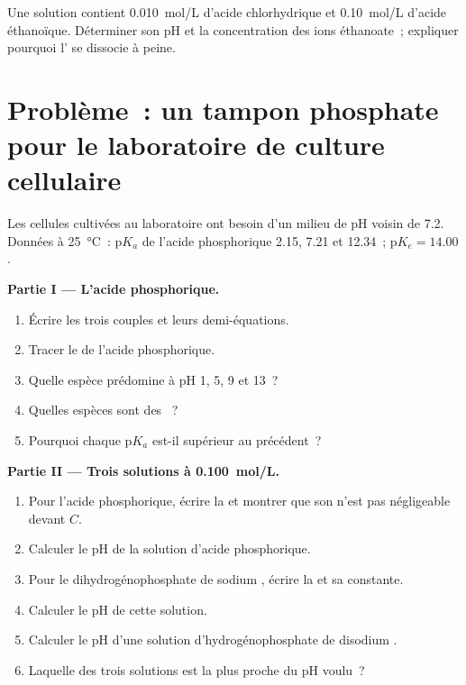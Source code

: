 \begin{exercise}[$\star\star\star$]\label{exo:b1:predominant-reaction:12}
Une solution contient \qty{0.010}{mol/L} d'acide chlorhydrique et
\qty{0.10}{mol/L} d'acide éthanoïque. Déterminer son pH et la
concentration des ions éthanoate~; expliquer pourquoi l' se
dissocie à peine.
\end{exercise}

\section{Problème~: un tampon phosphate pour le laboratoire de culture cellulaire}

\begin{problem}
\label{pb:b1:predominant-reaction:1}
Les cellules cultivées au laboratoire ont besoin d'un milieu de pH
voisin de 7.2. Données à \qty{25}{\celsius}~: $\mathrm{p}K_a$ de l'acide
phosphorique 2.15, 7.21 et 12.34~; $\mathrm{p}K_e = 14.00$.

\medskip
\noindent\textbf{Partie I --- L'acide phosphorique.}
\begin{enumerate}
  \item Écrire les trois couples et leurs demi-équations.
  \item Tracer le  de l'acide phosphorique.
  \item Quelle espèce prédomine à pH 1, 5, 9 et 13~?
  \item Quelles espèces sont des ~?
  \item Pourquoi chaque $\mathrm{p}K_a$ est-il supérieur au précédent~?
\end{enumerate}

\medskip
\noindent\textbf{Partie II --- Trois solutions à \qty{0.100}{mol/L}.}
\begin{enumerate}[resume]
  \item Pour l'acide phosphorique, écrire la  et
        montrer que son  n'est pas négligeable devant $C$.
  \item Calculer le pH de la solution d'acide phosphorique.
  \item Pour le dihydrogénophosphate de sodium , écrire la
         et sa constante.
  \item Calculer le pH de cette solution.
  \item Calculer le pH d'une solution d'hydrogénophosphate de disodium
        .
  \item Laquelle des trois solutions est la plus proche du pH voulu~?
\end{enumerate}


\end{problem}
